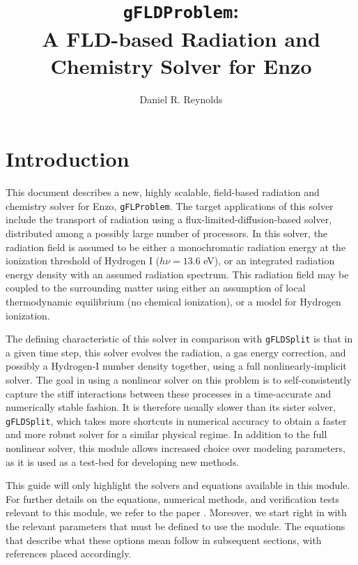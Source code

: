 \documentclass[letterpaper,10pt]{article}
\author{Daniel R. Reynolds}
\title{{\tt gFLDProblem}: \\
A FLD-based Radiation and Chemistry Solver for Enzo}
\renewcommand{\(}{\left(}
\renewcommand{\)}{\right)}
\begin{document}
\maketitle

\section{Introduction}
\label{sec:intro}

This document describes a new, highly scalable,
field-based radiation and chemistry solver for Enzo, 
{\tt gFLProblem}. The target applications of this solver include the
transport of radiation using a flux-limited-diffusion-based solver,
distributed among a possibly large number of 
processors.  In this solver, the radiation field is assumed to be
either a monochromatic radiation energy at the ionization threshold of
Hydrogen I ($h\nu = 13.6$ eV), or an integrated radiation energy
density with an assumed radiation spectrum.  This radiation field may
be coupled to the surrounding matter using either an assumption of
local thermodynamic equilibrium (no chemical ionization), or a model
for Hydrogen ionization. 

The defining characteristic of this solver in comparison 
with {\tt gFLDSplit} is that in a given time step, this
solver evolves the radiation, a gas energy correction, and possibly a
Hydrogen-I number density together, using a full nonlinearly-implicit
solver.  The goal in using a nonlinear solver on this problem is
to self-consistently capture the stiff interactions between these
processes in a time-accurate and numerically stable fashion.  It is
therefore usually slower than its sister solver, {\tt gFLDSplit},
which takes more shortcuts in numerical accuracy to obtain a faster
and more robust solver for a similar physical regime.  In addition to
the full nonlinear solver, this module allows increased choice over 
modeling parameters, as it is used as a test-bed for developing new
methods. 

This guide will only highlight the solvers and equations available in
this module.  For further details on the equations, numerical methods,
and verification tests relevant to this module, we refer to the paper 
\cite{ReynoldsHayesPaschosNorman2009}.  Moreover, we start right in
with the relevant parameters that must be defined to use the module.
The equations that describe what these options mean follow in
subsequent sections, with references placed accordingly.
\end{document}
